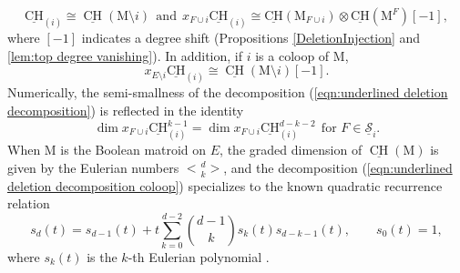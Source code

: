 \documentclass[11pt,reqno]{amsart}
\theoremstyle{definition}
\theoremstyle{remark}
\renewcommand{\dim}{\operatorname{dim}}
\renewcommand{\(}{\left(}
\renewcommand{\)}{\right)}
\newcommand{\<}{\left<}
\renewcommand{\>}{\right>}
\newcommand{\CH}{\operatorname{CH}}
\DeclareRobustCommand{\eulerian}{\genfrac<>{0pt}{}}
\begin{document}
\[
\underline{\mathrm{CH}}_{(i)} \cong \underline{\CH}(\mathrm{M} \setminus i)  \ \  \text{and} \ \ 
 x_{F\cup i}\underline{\mathrm{CH}}_{(i)} \cong \underline{\mathrm{CH}}(\mathrm{M}_{F\cup i}) \otimes  \underline{\mathrm{CH}}(\mathrm{M}^{F})[-1], %
\]
where $[-1]$ indicates a degree shift 
(Propositions \ref{DeletionInjection} and \ref{lem:top degree vanishing}).
In addition, if $i$ is a coloop of $\mathrm{M}$, 
\[
x_{E \setminus i}\underline{\mathrm{CH}}_{(i)} \cong \underline{\CH}(\mathrm{M} \setminus i)[-1].
\]
Numerically, the semi-smallness of the decomposition (\ref{eqn:underlined deletion decomposition})  %
is reflected in the identity
\[
\dim  x_{F\cup i}\underline{\mathrm{CH}}^{k-1}_{(i)}  = \dim  x_{F\cup i}\underline{\mathrm{CH}}_{(i)}^{d-k-2} \ \ \text{for $F \in \underline{\mathscr{S}}_i$}.
\]
When $\mathrm{M}$ is the Boolean matroid on $E$, 
the graded dimension of $\underline{\CH}(\mathrm{M})$
is given by the Eulerian numbers $\eulerian{d}{k}$,
and the decomposition (\ref{eqn:underlined deletion decomposition coloop}) specializes to the known quadratic recurrence relation
\[
s_d(t)=s_{d-1}(t)+ t \sum_{k=0}^{d-2} {d-1 \choose k} s_k(t) s_{d-k-1}(t), \qquad s_0(t)=1,
\]
where $s_k(t)$ is the $k$-th Eulerian polynomial \cite[Theorem 1.5]{Petersen}.
\end{document}
